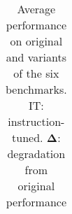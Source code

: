 \begin{table}[t!]
\begin{adjustbox}{max width=1.\columnwidth}
\begin{tabular}{lrcrrr}
\toprule
\end{tabular}
\end{adjustbox}
\caption{Average performance on original and \wicds variants of the six benchmarks. IT: instruction-tuned. $\mathbf{\Delta}$: degradation from original performance}
\label{tab:detailed-results}

\end{table}